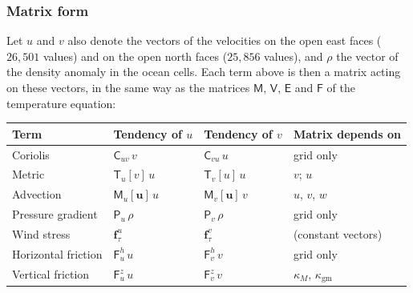 \documentclass{article}
\begin{document}
\subsubsection*{Matrix form}
Let $u$ and $v$ also denote the vectors of the velocities on the open east faces ($26{,}501$ values) and on the open north faces ($25{,}856$ values), and $\rho$ the vector of the density anomaly in the ocean cells. Each term above is then a matrix acting on these vectors, in the same way as the matrices $\mathsf{M}$, $\mathsf{V}$, $\mathsf{E}$ and $\mathsf{F}$ of the temperature equation:
\begin{center}
\begin{tabular}{llll}
\hline
Term & Tendency of $u$ & Tendency of $v$ & Matrix depends on \\
\hline
Coriolis & $\mathsf{C}_{uv}\,v$ & $\mathsf{C}_{vu}\,u$ & grid only \\
Metric & $\mathsf{T}_u[v]\,u$ & $\mathsf{T}_v[u]\,u$ & $v$; $u$ \\
Advection & $\mathsf{M}_u[\mathbf{u}]\,u$ & $\mathsf{M}_v[\mathbf{u}]\,v$ & $u$, $v$, $w$ \\
Pressure gradient & $\mathsf{P}_u\,\rho$ & $\mathsf{P}_v\,\rho$ & grid only \\
Wind stress & $\mathbf{f}^u_\tau$ & $\mathbf{f}^v_\tau$ & (constant vectors) \\
Horizontal friction & $\mathsf{F}^h_u\,u$ & $\mathsf{F}^h_v\,v$ & grid only \\
Vertical friction & $\mathsf{F}^z_u\,u$ & $\mathsf{F}^z_v\,v$ & $\kappa_M$, $\kappa_\text{gm}$ \\
\hline
\end{tabular}
\end{center}
\end{document}
